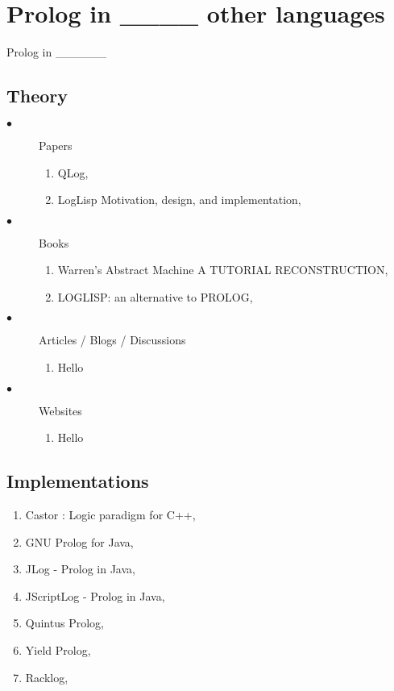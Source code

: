\documentclass[thesis-solanki.tex]{subfiles}
\begin{document}
\chapter{Prolog in \_\_\_\_ other  languages}\label{chap:prologin}

Prolog in \_\_\_\_\_\_
\section{Theory}
\begin{description}

\item[$\bullet$] Papers
\begin{enumerate}
\item QLog, \cite{komorowski1982qlog}
\item LogLisp Motivation, design, and implementation, \cite{robinson1982loglisp} 
\end{enumerate}

\item[$\bullet$] Books
\begin{enumerate}
\item Warren’s Abstract Machine A TUTORIAL RECONSTRUCTION, \cite{ait1999warren}
\item LOGLISP: an alternative to PROLOG, \cite{robinson1980loglisp}
\end{enumerate}

\item[$\bullet$] Articles / Blogs / Discussions
\begin{enumerate}
\item Hello
\end{enumerate}


\item[$\bullet$] Websites
\begin{enumerate}
\item Hello
\end{enumerate}

\end{description}

\section{Implementations}
\begin{enumerate}
\item Castor : Logic paradigm for C++, \cite{castorc++}
\item GNU Prolog for Java, \cite{gnuprolog}
\item JLog - Prolog in Java, \cite{jlog}
\item JScriptLog - Prolog in Java, \cite{jscriptlog}
\item  Quintus Prolog, \cite{quintusprolog}
\item Yield Prolog, \cite{yieldprolog}
\item Racklog, \cite{racklog}
\end{enumerate}
\end{document}

